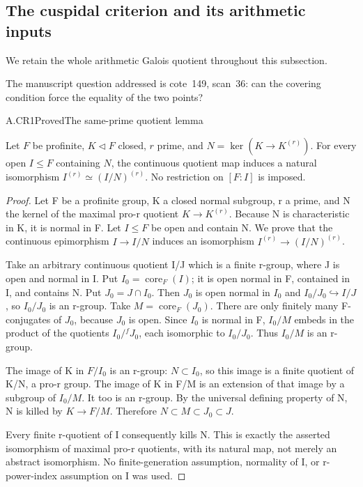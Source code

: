 \subsection{The cuspidal criterion and its arithmetic inputs}

We retain the whole arithmetic Galois quotient throughout this subsection.

The manuscript question addressed is cote~149, scan~36: can the covering condition force the equality of the two points?

\begin{claim}{A.CR1}{Proved}{The same-prime quotient lemma}

Let $F$ be profinite, $K\triangleleft F$ closed, $r$ prime, and
$N=\ker(K\to K^{(r)})$. For every open $I\le F$ containing $N$, the
continuous quotient map induces a natural isomorphism
$I^{(r)}\simeq(I/N)^{(r)}$. No restriction on $[F:I]$ is imposed.

\end{claim}

\begin{proof}

Let F be a profinite group, K a closed normal subgroup, r a prime, and N the kernel of the maximal pro-r quotient \(K{\to}K^{(r)}\). Because N is characteristic in K, it is normal in F. Let \(I{\le}F\) be open and contain N. We prove that the continuous epimorphism \(I{\to}I/N\) induces an isomorphism \(I^{(r)}\to(I/N)^{(r)}\).

Take an arbitrary continuous quotient I/J which is a finite r-group, where J is open and normal in I. Put \(I_0=\operatorname{core}_F(I)\); it is open normal in F, contained in I, and contains N. Put \(J_0=J{\cap}I_0\). Then \(J_0\) is open normal in \(I_0\) and \(I_0/J_0\hookrightarrow I/J\), so \(I_0/J_0\) is an r-group. Take \(M=\operatorname{core}_F(J_0)\). There are only finitely many F-conjugates of \(J_0\), because \(J_0\) is open. Since \(I_0\) is normal in F, \(I_0/M\) embeds in the product of the quotients \(I_0/{}^fJ_0\), each isomorphic to \(I_0/J_0\). Thus \(I_0/M\) is an r-group.

The image of K in \(F/I_0\) is an r-group: \(N{\subset}I_0\), so this image is a finite quotient of K/N, a pro-r group. The image of K in F/M is an extension of that image by a subgroup of \(I_0/M\). It too is an r-group. By the universal defining property of N, N is killed by \(K{\to}F/M\). Therefore \(N\subset M\subset J_0\subset J\).

Every finite r-quotient of I consequently kills N. This is exactly the asserted isomorphism of maximal pro-r quotients, with its natural map, not merely an abstract isomorphism. No finite-generation assumption, normality of I, or r-power-index assumption on I was used.


\end{proof}

